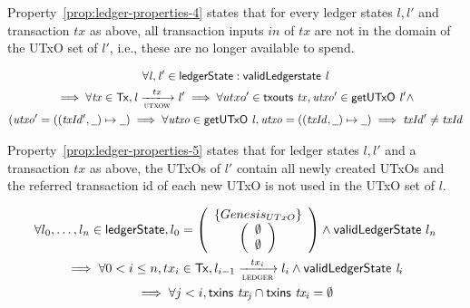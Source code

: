 Property~\ref{prop:ledger-properties-4} states that for every ledger states
$l, l'$ and transaction $tx$ as above, all transaction inputs $in$ of $tx$ are
not in the domain of the UTxO set of $l'$, i.e., these are no longer available
to spend.

\begin{property}
  \begin{multline*}
    \forall \var{l}, \var{l'} \in \ledgerState: \applyFun{validLedgerstate}{l}\\
    \implies \forall \var{tx} \in \Tx, \var{l} \trans{utxow}{tx} \var{l'}
    \implies \forall utxo' \in \applyFun{txouts}{tx}, \var{utxo'} \in
    \applyFun{getUTxO}{l'} \wedge \\(\var{utxo'} = ((\var{txId'}, \wcard) \mapsto
    \wcard) \implies \forall \var{utxo} \in \applyFun{getUTxO}{l}, \var{utxo} =
    ((\var{txId}, \wcard) \mapsto \wcard) \implies \var{txId'} \neq \var{txId}
  \end{multline*}
  \label{prop:ledger-properties-5}
\end{property}

Property~\ref{prop:ledger-properties-5} states that for ledger states $l, l'$
and a transaction $tx$ as above, the UTxOs of $l'$ contain all newly created
UTxOs and the referred transaction id of each new UTxO is not used in the UTxO
set of $l$.

\begin{property}
  \begin{multline*}
    \forall l_{0},\ldots,l_{n} \in \ledgerState, l_{0} =
    \left(
      \begin{array}{c}
        \left\{
        \genesisUTxO
        \right\} \\
        \left(
        \begin{array}{c}
          \emptyset\\
          \emptyset
        \end{array}
        \right)
      \end{array}
    \right) \wedge \applyFun{validLedgerState} l_{n} \\
    \implies \forall 0 < i \leq n, tx_{i} \in \Tx, l_{i-1}
    \trans{ledger}{tx_{i}} l_{i} \wedge \applyFun{validLedgerState} l_{i}
    \\ \implies \forall j < i, \applyFun{txins}{tx_{j}} \cap
    \applyFun{txins}{tx_{i}} = \emptyset
  \end{multline*}
  \label{prop:ledger-properties-no-double-spend}
\end{property}

